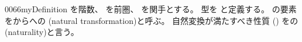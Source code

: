 \documentclass[index]{subfiles}
\begin{document}
\begin{myBlock}{0066}{myDefinition}
  を階数、
  を前圏、
  を関手とする。
  型を
  と定義する。
  の要素をからへの
  (natural transformation)と呼ぶ。
  自然変換が満たすべき性質
  ()
  をの(naturality)と言う。
\end{myBlock}
\end{document}
